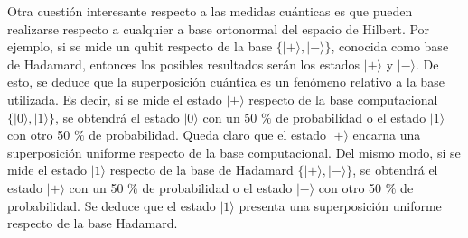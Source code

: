Otra cuestión interesante respecto a las medidas cuánticas es que pueden realizarse respecto a cualquier a base ortonormal del espacio de Hilbert. Por ejemplo, si se mide un qubit respecto de la base $\{ |+ \rangle, | - \rangle \}$, conocida como base de Hadamard, entonces los posibles resultados serán los estados $ | + \rangle$ y $ | - \rangle $. De esto, se deduce que la superposición cuántica es un fenómeno relativo a la base utilizada. Es decir, si se mide el estado $| + \rangle $ respecto de la base computacional $\{ |0 \rangle, | 1 \rangle \}$, se obtendrá el estado $ | 0 \rangle $ con un 50 $ \% $ de probabilidad o el estado $ | 1 \rangle $ con otro 50 $ \% $ de probabilidad. Queda claro que el estado $ | + \rangle $ encarna una superposición uniforme respecto de la base computacional. Del mismo modo, si se mide el estado $| 1 \rangle $ respecto de la base de Hadamard $\{ |+ \rangle, | - \rangle \}$, se obtendrá el estado $ | + \rangle $ con un 50 $ \% $ de probabilidad o el estado $ | - \rangle $ con otro 50 $ \% $ de probabilidad. Se deduce que el estado $ | 1 \rangle $ presenta una superposición uniforme respecto de la base Hadamard.

